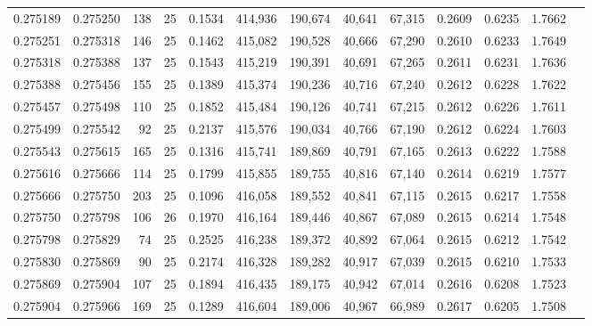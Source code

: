 \begin{tabular}{rrrrrrrrrrrrr}
0.275189 & 0.275250 &   138 &  25 &                                     0.1534 & 414,936 & 190,674 &  40,641 &  67,315 & 0.2609 & 0.6235 & 1.7662 \\
0.275251 & 0.275318 &   146 &  25 &                                     0.1462 & 415,082 & 190,528 &  40,666 &  67,290 & 0.2610 & 0.6233 & 1.7649 \\
0.275318 & 0.275388 &   137 &  25 &                                     0.1543 & 415,219 & 190,391 &  40,691 &  67,265 & 0.2611 & 0.6231 & 1.7636 \\
0.275388 & 0.275456 &   155 &  25 &                                     0.1389 & 415,374 & 190,236 &  40,716 &  67,240 & 0.2612 & 0.6228 & 1.7622 \\
0.275457 & 0.275498 &   110 &  25 &                                     0.1852 & 415,484 & 190,126 &  40,741 &  67,215 & 0.2612 & 0.6226 & 1.7611 \\
0.275499 & 0.275542 &    92 &  25 &                                     0.2137 & 415,576 & 190,034 &  40,766 &  67,190 & 0.2612 & 0.6224 & 1.7603 \\
0.275543 & 0.275615 &   165 &  25 &                                     0.1316 & 415,741 & 189,869 &  40,791 &  67,165 & 0.2613 & 0.6222 & 1.7588 \\
0.275616 & 0.275666 &   114 &  25 &                                     0.1799 & 415,855 & 189,755 &  40,816 &  67,140 & 0.2614 & 0.6219 & 1.7577 \\
0.275666 & 0.275750 &   203 &  25 &                                     0.1096 & 416,058 & 189,552 &  40,841 &  67,115 & 0.2615 & 0.6217 & 1.7558 \\
0.275750 & 0.275798 &   106 &  26 &                                     0.1970 & 416,164 & 189,446 &  40,867 &  67,089 & 0.2615 & 0.6214 & 1.7548 \\
0.275798 & 0.275829 &    74 &  25 &                                     0.2525 & 416,238 & 189,372 &  40,892 &  67,064 & 0.2615 & 0.6212 & 1.7542 \\
0.275830 & 0.275869 &    90 &  25 &                                     0.2174 & 416,328 & 189,282 &  40,917 &  67,039 & 0.2615 & 0.6210 & 1.7533 \\
0.275869 & 0.275904 &   107 &  25 &                                     0.1894 & 416,435 & 189,175 &  40,942 &  67,014 & 0.2616 & 0.6208 & 1.7523 \\
0.275904 & 0.275966 &   169 &  25 &                                     0.1289 & 416,604 & 189,006 &  40,967 &  66,989 & 0.2617 & 0.6205 & 1.7508 \\

\end{tabular}

